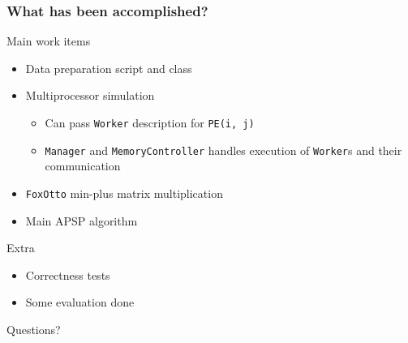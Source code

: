 \documentclass{beamer}
\begin{document}
\begin{frame}[t]
    \frametitle{What has been accomplished?}

    \begin{block}{Main work items}
        \begin{itemize}
            \item Data preparation script and class
            \item Multiprocessor simulation
                \begin{itemize}
                    \item Can pass \texttt{Worker} description for \texttt{PE(i, j)}
                    \item \texttt{Manager} and \texttt{MemoryController} handles
                        execution of \texttt{Worker}s and their communication
                \end{itemize}
            \item \texttt{FoxOtto} min-plus matrix multiplication
            \item Main APSP algorithm
        \end{itemize}
    \end{block}

    \begin{block}{Extra}
        \begin{itemize}
            \item Correctness tests
            \item Some evaluation done
        \end{itemize}
    \end{block}

\end{frame}

\begin{frame}[plain,c]
    \begin{center}
          {\Huge Questions?}
    \end{center}
\end{frame}
\end{document}
